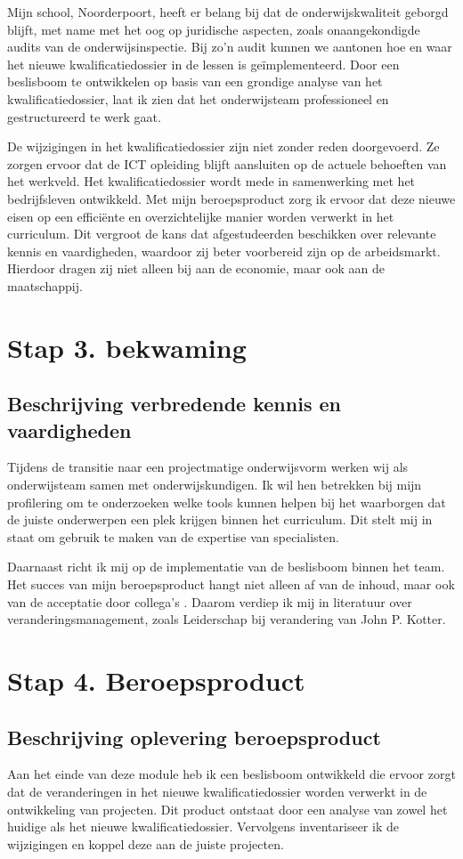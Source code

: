 Mijn school, Noorderpoort, heeft er belang bij dat de onderwijskwaliteit geborgd blijft, met name met het oog op juridische aspecten, zoals onaangekondigde audits van de onderwijsinspectie. Bij zo'n audit kunnen we aantonen hoe en waar het nieuwe kwalificatiedossier in de lessen is geïmplementeerd. Door een beslisboom te ontwikkelen op basis van een grondige analyse van het kwalificatiedossier, laat ik zien dat het onderwijsteam professioneel en gestructureerd te werk gaat.

De wijzigingen in het kwalificatiedossier zijn niet zonder reden doorgevoerd. Ze zorgen ervoor dat de ICT opleiding blijft aansluiten op de actuele behoeften van het werkveld. Het kwalificatiedossier wordt mede in samenwerking met het bedrijfsleven ontwikkeld. Met mijn beroepsproduct zorg ik ervoor dat deze nieuwe eisen op een efficiënte en overzichtelijke manier worden verwerkt in het curriculum. Dit vergroot de kans dat afgestudeerden beschikken over relevante kennis en vaardigheden, waardoor zij beter voorbereid zijn op de arbeidsmarkt. Hierdoor dragen zij niet alleen bij aan de economie, maar ook aan de maatschappij.

\section{Stap 3. bekwaming}
\subsection{Beschrijving verbredende kennis en vaardigheden}
Tijdens de transitie naar een projectmatige onderwijsvorm werken wij als onderwijsteam samen met onderwijskundigen. Ik wil hen betrekken bij mijn profilering om te onderzoeken welke tools kunnen helpen bij het waarborgen dat de juiste onderwerpen een plek krijgen binnen het curriculum. Dit stelt mij in staat om gebruik te maken van de expertise van specialisten.

Daarnaast richt ik mij op de implementatie van de beslisboom binnen het team. Het succes van mijn beroepsproduct hangt niet alleen af van de inhoud, maar ook van de acceptatie door collega's
. Daarom verdiep ik mij in literatuur over veranderingsmanagement, zoals Leiderschap bij verandering van John P. Kotter.

\section{Stap 4. Beroepsproduct}
\subsection{Beschrijving oplevering beroepsproduct}
Aan het einde van deze module heb ik een beslisboom ontwikkeld die ervoor zorgt dat de veranderingen in het nieuwe kwalificatiedossier worden verwerkt in de ontwikkeling van projecten. Dit product ontstaat door een analyse van zowel het huidige als het nieuwe kwalificatiedossier. Vervolgens inventariseer ik de wijzigingen en koppel deze aan de juiste projecten.

